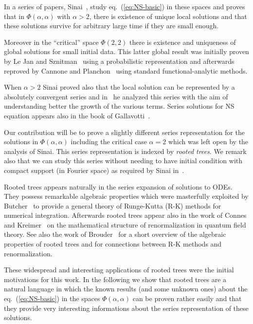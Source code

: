 \documentclass[a4paper,12pt,reqno]{amsart}
\newcommand{\1}{{\bf 1}}
\begin{document}
In a series of papers, Sinai~\cite{Sinai1,Sinai2,Sinai3}, study
eq.~(\ref{eq:NS-basic}) in these spaces and proves that in
$\Phi(\alpha,\alpha)$ with $\alpha > 2$, there is existence of unique local
solutions and that these solutions survive for arbitrary large time if
they are small enough.

Moreover in the ``critical'' space $\Phi(2,2)$ there is existence and
uniqueness of
global solutions for small initial data. This latter global result
was initially proven  by Le Jan and Sznitman~\cite{LS} using a probabilistic representation
and afterwards reproved by Cannone and Planchon~\cite{CP} using standard
functional-analytic methods. 

When $\alpha > 2$ Sinai proved also that the local solution can be
represented by a absolutely convergent series and in~\cite{Sinai3} he
analyzed this series with the aim of understanding better the growth of
the various terms.
Series solutions for NS equation appears also in the book of Gallavotti~\cite{Gall}.

Our contribution will be to prove a slightly different series representation
for the solutions in $\Phi(\alpha,\alpha)$ including the critical case
$\alpha=2$ which was left open by the analysis of Sinai. This 
series representation is indexed by \emph{rooted trees}. We remark
also that we can study this series without needing to have initial
condition with compact support (in Fourier space) as required by Sinai in~\cite{Sinai3}.

Rooted trees appears naturally in the series expansion of solutions to
ODEs. They possess remarkable algebraic properties which were
masterfully exploited by Butcher~\cite{Butch} to provide a general
theory of Runge-Kutta (R-K) methods for numerical integration. 
Afterwards rooted trees appear also in the work of Connes and Kreimer~\cite{CK}
on the mathematical structure of renormalization in quantum field
theory. See also the work of Brouder~\cite{Broud,Bit} for a short overview
of the algebraic properties of rooted trees and for connections
between R-K methods and renormalization.  

These widespread and interesting applications of rooted trees were the
initial motivations for this work. In the following we show that
rooted trees are a natural language in which the known results (and
some unknown ones) about
the eq.~(\ref{eq:NS-basic}) in the spaces $\Phi(\alpha,\alpha)$ can be
proven rather easily and that they provide very interesting informations
about the series representation of these solutions. 
\end{document}

